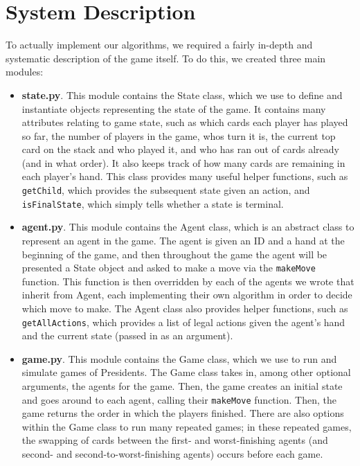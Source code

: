 \documentclass[11pt]{article}
\begin{document}
\section{System Description}

To actually implement our algorithms, we required a fairly in-depth and systematic description of the game itself. To do this, we created three main modules:
\begin{itemize}
  \item \textbf{state.py}. This module contains the State class, which we use to define and instantiate objects representing the state of the game. It contains many attributes relating to game state, such as which cards each player has played so far, the number of players in the game, whos turn it is, the current top card on the stack and who played it, and who has ran out of cards already (and in what order). It also keeps track of how many cards are remaining in each player's hand. This class provides many useful helper functions, such as \verb|getChild|, which provides the subsequent state given an action, and \verb|isFinalState|, which simply tells whether a state is terminal.
  \item \textbf{agent.py}. This module contains the Agent class, which is an abstract class to represent an agent in the game. The agent is given an ID and a hand at the beginning of the game, and then throughout the game the agent will be presented a State object and asked to make a move via the \verb|makeMove| function. This function is then overridden by each of the agents we wrote that inherit from Agent, each implementing their own algorithm in order to decide which move to make. The Agent class also provides helper functions, such as \verb|getAllActions|, which provides a list of legal actions given the agent's hand and the current state (passed in as an argument).
  \item \textbf{game.py}. This module contains the Game class, which we use to run and simulate games of Presidents. The Game class takes in, among other optional arguments, the agents for the game. Then, the game creates an initial state and goes around to each agent, calling their \verb|makeMove| function. Then, the game returns the order in which the players finished. There are also options within the Game class to run many repeated games; in these repeated games, the swapping of cards between the first- and worst-finishing agents (and second- and second-to-worst-finishing agents) occurs before each game.
\end{itemize}
\end{document}
